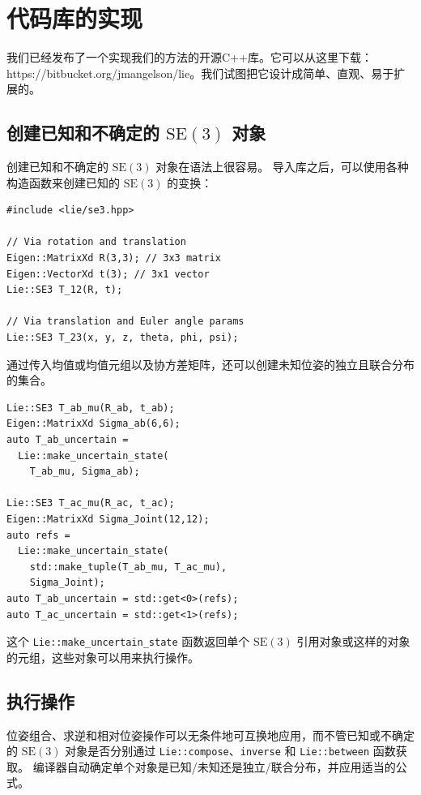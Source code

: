 \section{代码库的实现}
\label{sec:library}

我们已经发布了一个实现我们的方法的开源C++库。它可以从这里下载：https://bitbucket.org/jmangelson/lie。我们试图把它设计成简单、直观、易于扩展的。 

\subsection{创建已知和不确定的 $\mathrm{SE}(3)$ 对象}

创建已知和不确定的 $\mathrm{SE}(3)$ 对象在语法上很容易。 
导入库之后，可以使用各种构造函数来创建已知的 $\mathrm{SE}(3)$ 的变换： 
\begin{verbatim}
#include <lie/se3.hpp>

// Via rotation and translation 
Eigen::MatrixXd R(3,3); // 3x3 matrix 
Eigen::VectorXd t(3); // 3x1 vector
Lie::SE3 T_12(R, t);    
    
// Via translation and Euler angle params
Lie::SE3 T_23(x, y, z, theta, phi, psi);
\end{verbatim}

通过传入均值或均值元组以及协方差矩阵，还可以创建未知位姿的独立且联合分布的集合。 
\begin{verbatim}
Lie::SE3 T_ab_mu(R_ab, t_ab);  
Eigen::MatrixXd Sigma_ab(6,6);
auto T_ab_uncertain = 
  Lie::make_uncertain_state(
    T_ab_mu, Sigma_ab);
   
Lie::SE3 T_ac_mu(R_ac, t_ac);  
Eigen::MatrixXd Sigma_Joint(12,12);
auto refs = 
  Lie::make_uncertain_state(
    std::make_tuple(T_ab_mu, T_ac_mu), 
    Sigma_Joint);
auto T_ab_uncertain = std::get<0>(refs);
auto T_ac_uncertain = std::get<1>(refs);
\end{verbatim}

这个 \texttt{Lie::make\_uncertain\_state} 函数返回单个 $\mathrm{SE}(3)$ 引用对象或这样的对象的元组，这些对象可以用来执行操作。

\subsection{执行操作}

位姿组合、求逆和相对位姿操作可以无条件地可互换地应用，而不管已知或不确定的 $\mathrm{SE}(3)$ 对象是否分别通过 \texttt{Lie::compose}、\texttt{inverse} 和 \texttt{Lie::between} 函数获取。 
编译器自动确定单个对象是已知/未知还是独立/联合分布，并应用适当的公式。 

